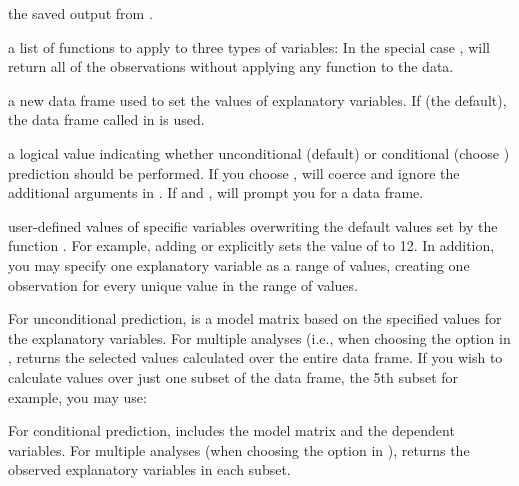 \begin{Arguments}
\begin{ldescription}
\item[\code{object}] the saved output from . 
\item[\code{fn}] a list of functions to apply to three types of variables:
In the special case ,  will return all
of the observations without applying any function to the data.  
\item[\code{data}] a new data frame used to set the values of
explanatory variables. If  (the default), the
data frame called in  is used. 
\item[\code{cond}] a logical value indicating whether unconditional
(default) or conditional (choose ) prediction
should be performed.  If you choose , 
will coerce  and ignore the additional arguments in 
.  If  and ,
 will prompt you for a data frame.  
\item[\code{...}] user-defined values of specific variables
overwriting the default values set by the function .  For
example, adding  or 
explicitly sets the value of  to 12.  In addition, you may
specify one explanatory variable as a range of values, creating one
observation for every unique value in the range of values. 
\end{ldescription}
\end{Arguments}
\begin{Value}
For unconditional prediction,  is a model matrix based
on the specified values for the explanatory variables.  For multiple
analyses (i.e., when choosing the  option in ,
 returns the selected values calculated over the entire
data frame.  If you wish to calculate values over just one subset of
the data frame, the 5th subset for example, you may use:  

For conditional prediction,  includes the model matrix
and the dependent variables.  For multiple analyses (when choosing
the  option in ),  returns the
observed explanatory variables in each subset.
\end{Value}
